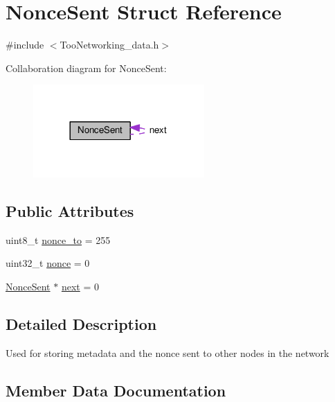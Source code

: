\hypertarget{structNonceSent}{}\section{Nonce\+Sent Struct Reference}
\label{structNonceSent}


{\ttfamily \#include $<$Too\+Networking\+\_\+data.\+h$>$}



Collaboration diagram for Nonce\+Sent\+:\nopagebreak
\begin{figure}[H]
\begin{center}
\leavevmode
\includegraphics[width=185pt]{structNonceSent__coll__graph}
\end{center}
\end{figure}
\subsection*{Public Attributes}
\begin{DoxyCompactItemize}
\item 
uint8\+\_\+t \hyperlink{structNonceSent_ad5484888a11a0c041610c38b564c5627}{nonce\+\_\+to} = 255
\item 
uint32\+\_\+t \hyperlink{structNonceSent_ae9d167a911c22c9d4490d2fee2093c10}{nonce} = 0
\item 
\hyperlink{structNonceSent}{Nonce\+Sent} $\ast$ \hyperlink{structNonceSent_a1c51c6d93e58ff1d94a0ab691c28fd24}{next} = 0
\end{DoxyCompactItemize}


\subsection{Detailed Description}
Used for storing metadata and the nonce sent to other nodes in the network 

\subsection{Member Data Documentation}
\mbox{\label{structNonceSent_a1c51c6d93e58ff1d94a0ab691c28fd24}} 
